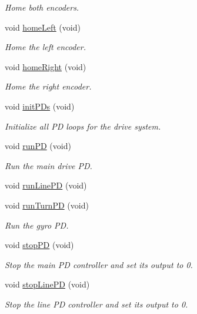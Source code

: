\begin{DoxyCompactItemize}
\begin{DoxyCompactList}\small\item\em Home both encoders. \end{DoxyCompactList}\item 
void \hyperlink{class_drive_train_a1ef100b1637bdefca2634ff8b28b41d7}{home\+Left} (void)
\begin{DoxyCompactList}\small\item\em Home the left encoder. \end{DoxyCompactList}\item 
void \hyperlink{class_drive_train_ad4a50d49f7bf22ea5b35c7d63b6e7736}{home\+Right} (void)
\begin{DoxyCompactList}\small\item\em Home the right encoder. \end{DoxyCompactList}\item 
void \hyperlink{class_drive_train_a2a0d74ee4c5e489de11bb51e6cebf767}{init\+P\+Ds} (void)
\begin{DoxyCompactList}\small\item\em Initialize all PD loops for the drive system. \end{DoxyCompactList}\item 
void \hyperlink{class_drive_train_a8355f8e214ceb1ecf1bce299ba692b22}{run\+PD} (void)
\begin{DoxyCompactList}\small\item\em Run the main drive PD. \end{DoxyCompactList}\item 
void \hyperlink{class_drive_train_a42bf43e9e989feeead853a71afe8bbb0}{run\+Line\+PD} (void)
\item 
void \hyperlink{class_drive_train_abbd159972d9f4dd6fa0dd0f398a498dc}{run\+Turn\+PD} (void)
\begin{DoxyCompactList}\small\item\em Run the gyro PD. \end{DoxyCompactList}\item 
void \hyperlink{class_drive_train_a597c70f11ab197d71360664981e1a2a8}{stop\+PD} (void)
\begin{DoxyCompactList}\small\item\em Stop the main PD controller and set its output to 0. \end{DoxyCompactList}\item 
void \hyperlink{class_drive_train_a17dc5a1823a710f555ea34f0a1ad57ff}{stop\+Line\+PD} (void)
\begin{DoxyCompactList}\small\item\em Stop the line PD controller and set its output to 0. \end{DoxyCompactList}\item 

\end{DoxyCompactItemize}
